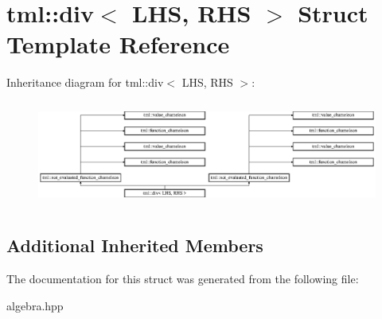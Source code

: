 \hypertarget{structtml_1_1div}{\section{tml\+:\+:div$<$ L\+H\+S, R\+H\+S $>$ Struct Template Reference}
\label{structtml_1_1div}
}
Inheritance diagram for tml\+:\+:div$<$ L\+H\+S, R\+H\+S $>$\+:\begin{figure}[H]
\begin{center}
\leavevmode
\includegraphics[height=3.500000cm]{structtml_1_1div}
\end{center}
\end{figure}
\subsection*{Additional Inherited Members}


The documentation for this struct was generated from the following file\+:\begin{DoxyCompactItemize}
\item 
algebra.\+hpp\end{DoxyCompactItemize}
